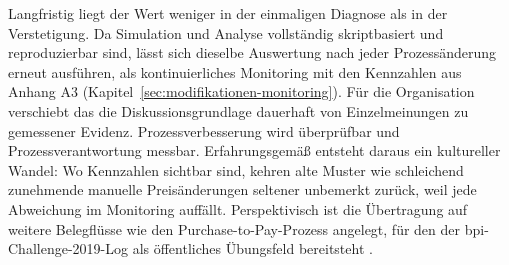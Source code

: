 Langfristig liegt der Wert weniger in der einmaligen Diagnose als in der Verstetigung. Da Simulation und Analyse vollständig skriptbasiert und reproduzierbar sind, lässt sich dieselbe Auswertung nach jeder Prozessänderung erneut ausführen, als kontinuierliches Monitoring mit den Kennzahlen aus Anhang A3 (Kapitel~\ref{sec:modifikationen-monitoring}). Für die Organisation verschiebt das die Diskussionsgrundlage dauerhaft von Einzelmeinungen zu gemessener Evidenz. Prozessverbesserung wird überprüfbar und Prozessverantwortung messbar. Erfahrungsgemäß entsteht daraus ein kultureller Wandel: Wo Kennzahlen sichtbar sind, kehren alte Muster wie schleichend zunehmende manuelle Preisänderungen seltener unbemerkt zurück, weil jede Abweichung im Monitoring auffällt. Perspektivisch ist die Übertragung auf weitere Belegflüsse wie den Purchase-to-Pay-Prozess angelegt, für den der \gls{bpi}-Challenge-2019-Log als öffentliches Übungsfeld bereitsteht \parencite{vandongen2019bpi}.
